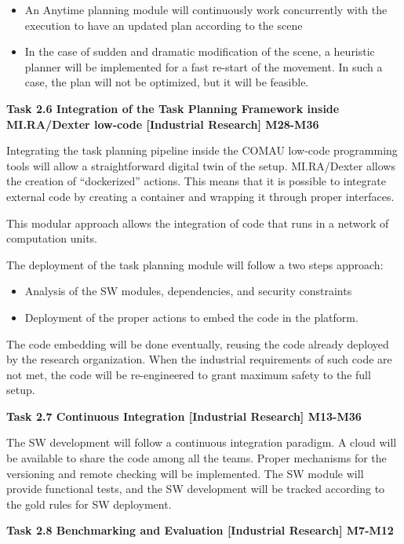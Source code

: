 \begin{longtable}[]
{\begin{minipage}[t]{\linewidth}
\begin{itemize}
\item
  An Anytime planning module will continuously work concurrently with
  the execution to have an updated plan according to the scene
\item
  In the case of sudden and dramatic modification of the scene, a
  heuristic planner will be implemented for a fast re-start of the
  movement. In such a case, the plan will not be optimized, but it will
  be feasible.
\end{itemize}

\textbf{Task 2.6 Integration of the Task Planning Framework inside
MI.RA/Dexter low-code {[}Industrial Research{]} M28-M36}

Integrating the task planning pipeline inside the COMAU low-code
programming tools will allow a straightforward digital twin of the
setup. MI.RA/Dexter allows the creation of ``dockerized'' actions. This
means that it is possible to integrate external code by creating a
container and wrapping it through proper interfaces.

This modular approach allows the integration of code that runs in a
network of computation units.

The deployment of the task planning module will follow a two steps
approach:

\begin{itemize}
\item
  Analysis of the SW modules, dependencies, and security constraints
\item
  Deployment of the proper actions to embed the code in the platform.
\end{itemize}

The code embedding will be done eventually, reusing the code already
deployed by the research organization. When the industrial requirements
of such code are not met, the code will be re-engineered to grant
maximum safety to the full setup.

\textbf{Task 2.7 Continuous Integration {[}Industrial Research{]}
M13-M36}

The SW development will follow a continuous integration paradigm. A
cloud will be available to share the code among all the teams. Proper
mechanisms for the versioning and remote checking will be implemented.
The SW module will provide functional tests, and the SW development will
be tracked according to the gold rules for SW deployment.

\textbf{Task 2.8 Benchmarking and Evaluation {[}Industrial Research{]}
M7-M12}


\end{minipage}}
\end{longtable}
